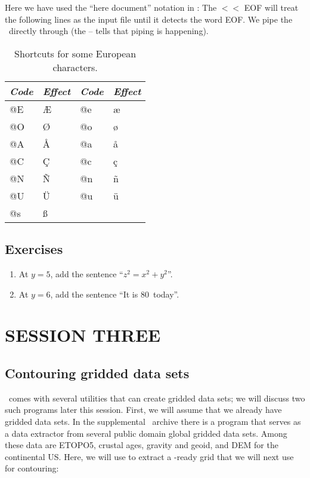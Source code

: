 \documentclass[11pt]{report}
\begin{document}

Here we have used the ``here document'' notation in \UNIX: The $<$$<$ EOF
will treat the following lines as the input file until it detects the
word EOF.  We pipe the \PS\ directly through  (the -- tells
 that piping is happening).

\begin{table}[H]
\centering
\begin{tabular}{|l|l||l|l|} \hline
\emph{Code} & \emph{Effect}  & \emph{Code} & \emph{Effect} \\ \hline
@E &  \AE   & @e &  \ae   \\ \hline
@O &  \O    & @o &  \o    \\ \hline
@A &  \AA   & @a &  \aa   \\ \hline
@C &  \c{C} & @c &  \c{c} \\ \hline
@N &  \~{N} & @n &  \~{n} \\ \hline
@U &  \"{U} & @u &  \"{u} \\ \hline
@s &  \ss   &    &        \\ \hline
\end{tabular}
\caption{Shortcuts for some European characters.}
\label{tbl:scand}
\end{table}

\section{Exercises}

\begin{enumerate}

\item At $y = 5$, add the sentence ``$z^2 = x^2 + y^2$''.

\item At $y = 6$, add the sentence ``It is 80\DS\ today''.

\end{enumerate}

\chapter{SESSION THREE}

\section{Contouring gridded data sets}

\GMT\ comes with several utilities that can create gridded data
sets; we will discuss two such programs later this session.  First,
we will assume that we already have gridded data sets.  In the
supplemental \GMT\ archive there is a program that serves as a data
extractor from several public domain global gridded data sets.
Among these data are ETOPO5, crustal ages, gravity and geoid,
and DEM for the continental US.  Here, we will use 
to extract a \GMT-ready grid that we will next use for contouring:
\end{document}
